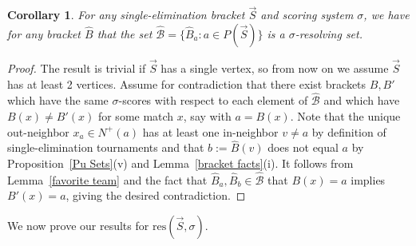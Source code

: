 \documentclass[12pt,letterpaper]{article}
\newtheorem{cor}[thm]{Corollary}
\theoremstyle{definition}
\newcommand{\sig}{\sigma}
\renewcommand{\1}{\mathbbm{1}}
\renewcommand{\c}[1]{\mathcal{#1}}
\newcommand{\tour}{\vec{S}}
\newcommand{\res}{\mathrm{res}}
\begin{document}
\begin{cor}\label{favorite player corollary}
	For any single-elimination bracket $\tour$ and scoring system $\sig$, we have for any bracket $\widehat{B}$ that the set $\widehat{\c{B}}=\{\widehat{B}_a: a\in P(\tour)\}$ is a $\sig$-resolving set.
\end{cor}
\begin{proof}
	The result is trivial if $\tour$ has a single vertex, so from now on we assume $\tour$ has at least 2 vertices. Assume for contradiction that there exist brackets $B,B'$ which have the same $\sig$-scores with respect to each element of $\widehat{\c{B}}$ and which have $B(x)\ne B'(x)$ for some match $x$, say with $a=B(x)$.  Note that the unique out-neighbor $x_a\in N^+(a)$ has at least one in-neighbor $v\ne a$ by definition of single-elimination tournaments and that $b:=\widehat{B}(v)$ does not equal $a$ by Proposition~\ref{Pu Sets}(v) and Lemma~\ref{bracket facts}(i).  It follows from Lemma~\ref{favorite team} and the fact that $\widehat{B}_a,\widehat{B}_b\in \widehat{\c{B}}$ that $B(x)=a$ implies $B'(x)=a$, giving the desired contradiction.
\end{proof}

We now prove our results for $\res(\tour,\sig)$.
\end{document}
